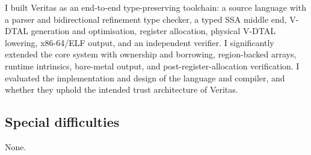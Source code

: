 I built Veritas as an end-to-end type-preserving toolchain: a source language with a parser and bidirectional refinement type checker, a typed SSA middle end, V-DTAL generation and optimisation, register allocation, physical V-DTAL lowering, x86-64/ELF output, and an independent verifier. I significantly extended the core system with ownership and borrowing, region-backed arrays, runtime intrinsics, bare-metal output, and post-register-allocation verification. I evaluated the implementation and design of the language and compiler, and whether they uphold the intended trust architecture of Veritas.

\subsection*{Special difficulties}
None.


%
%
%

